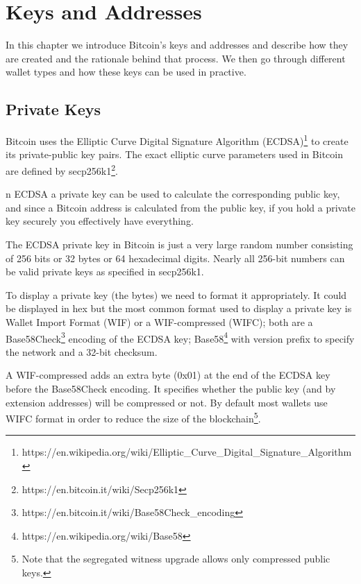 \chapter{Keys and Addresses}
\label{ch:keys-and-addresses}

\begin{summary}
In this chapter we introduce Bitcoin’s keys and addresses and describe how they are created and the rationale behind that process. We then go through different wallet types and how these keys can be used in practive.
\end{summary}

\section{Private Keys}
Bitcoin uses the Elliptic Curve Digital Signature Algorithm (ECDSA)\footnote{https://en.wikipedia.org/wiki/Elliptic\_Curve\_Digital\_Signature\_Algorithm} to create its private-public key pairs. The exact elliptic curve parameters used in Bitcoin are defined by secp256k1\footnote{https://en.bitcoin.it/wiki/Secp256k1}.

\begin{note}
n ECDSA a private key can be used to calculate the corresponding public key, and since a Bitcoin address is calculated from the public key, if you hold a private key securely you effectively have everything.
\end{note}

The ECDSA private key in Bitcoin is just a very large random number consisting of 256 bits or 32 bytes or 64 hexadecimal digits. Nearly all 256-bit numbers can be valid private keys as specified in secp256k1.

To display a private key (the bytes) we need to format it appropriately. It could be displayed in hex but the most common format used to display a private key is Wallet Import Format (WIF) or a WIF-compressed (WIFC); both are a Base58Check\footnote{https://en.bitcoin.it/wiki/Base58Check\_encoding} encoding of the ECDSA key; Base58\footnote{https://en.wikipedia.org/wiki/Base58} with version prefix to specify the network and a 32-bit checksum.

A WIF-compressed adds an extra byte (0x01) at the end of the ECDSA key before the Base58Check encoding. It specifies whether the public key (and by extension addresses) will be compressed or not. By default most wallets use WIFC format in order to reduce the size of the blockchain\footnote{Note that the segregated witness upgrade allows only compressed public keys.}.


